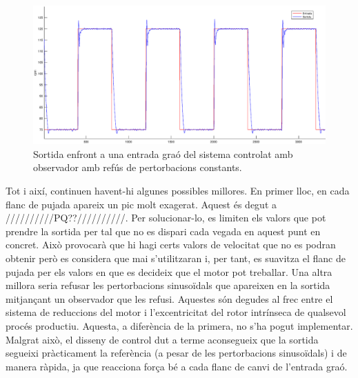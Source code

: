 \documentclass[]{article}
\begin{document}
\begin{figure}[H]
\centering
	\includegraphics[width = .8\linewidth]{images/Entrada_Sortida_Refus_Constant.eps}
	\caption{Sortida enfront a una entrada graó del sistema controlat amb observador amb refús de pertorbacions constants.}
	\label{fig:observador_pertorbacions}
\end{figure}

Tot i així, continuen havent-hi algunes possibles millores. En primer lloc, en cada flanc de pujada apareix un pic molt exagerat. Aquest és degut a //////////PQ??//////////. Per solucionar-lo, es limiten els valors que pot prendre la sortida per tal que no es dispari cada vegada en aquest punt en concret. Això provocarà que hi hagi certs valors de velocitat que no es podran obtenir però es considera que mai s'utilitzaran i, per tant, es suavitza el flanc de pujada per els valors en que es decideix que el motor pot treballar. Una altra millora seria refusar les pertorbacions sinusoïdals que apareixen en la sortida mitjançant un observador que les refusi. Aquestes són degudes al frec entre el sistema de reduccions del motor i l'excentricitat del rotor intrínseca de qualsevol procés productiu. Aquesta, a diferència de la primera, no s'ha pogut implementar. Malgrat això, el disseny de control dut a terme aconsegueix que la sortida segueixi pràcticament la referència (a pesar de les pertorbacions sinusoïdals) i de manera ràpida, ja que reacciona força bé a cada flanc de canvi de l'entrada graó.
\end{document}
